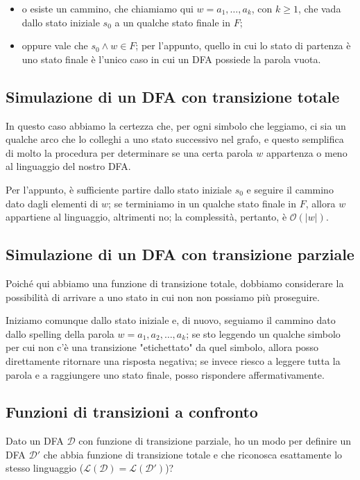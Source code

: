 \documentclass[class=book, crop=false, oneside, 12pt]{standalone}
\begin{document}
\begin{itemize}
    \item o esiste un cammino, che chiamiamo qui \(w = a_1, \ldots, a_k\), con \(k \ge 1\), che vada dallo stato iniziale \(s_0\) a un qualche stato finale in \(F\);
    \item oppure vale che \(s_0 \land w \in F\); per l'appunto, quello in cui lo stato di partenza è uno stato finale è l'unico caso in cui un DFA possiede la parola vuota.
\end{itemize}

\subsection{Simulazione di un DFA con transizione totale}
In questo caso abbiamo la certezza che, per ogni  simbolo che leggiamo, ci sia un qualche arco che lo colleghi a uno stato successivo nel grafo, e questo semplifica di molto la procedura per determinare se una certa parola \(w\) appartenza o meno al linguaggio del nostro DFA.

Per l'appunto, è sufficiente partire dallo stato iniziale \(s_0\) e seguire il cammino dato dagli elementi di \(w\); se terminiamo in un qualche stato finale in \(F\), allora \(w\) appartiene al linguaggio, altrimenti no; la complessità, pertanto, è \(\mathcal{O}(|w|)\).

\subsection{Simulazione di un DFA con transizione parziale}
Poiché qui abbiamo una funzione di transizione totale, dobbiamo considerare la possibilità di arrivare a uno stato in cui non non possiamo più proseguire. 

Iniziamo comunque dallo stato iniziale e, di nuovo, seguiamo il cammino dato dallo spelling della parola \(w = a_1, a_2, \ldots, a_k\); se sto leggendo un qualche simbolo per cui non c'è una transizione "etichettato" da quel simbolo, allora posso direttamente ritornare una risposta negativa; se invece riesco a leggere tutta la parola e a raggiungere uno stato finale, posso rispondere affermativamente.

\subsection{Funzioni di transizioni a confronto}
Dato un DFA \(\mathcal{D}\) con funzione di transizione parziale, ho un modo per definire un DFA \(\mathcal{D}'\) che abbia funzione di transizione totale e che riconosca esattamente lo stesso linguaggio (\(\mathcal{L(D) = \mathcal{L}(\mathcal{D}')}\))?
\end{document}
